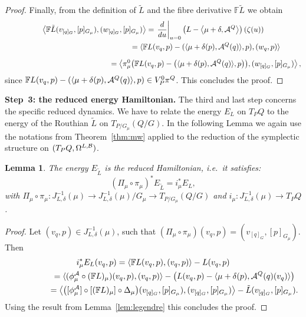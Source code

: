 \documentclass[11pt]{article}
\newtheorem{lemma}{Lemma}
\newcommand{\A}{{\cal A}}
\newcommand{\B}{{\cal B}}
\newcommand{\F}{\mathbb{F}}
\begin{document}
\begin{proof}
Finally, from the def\/inition of $\tilde L$ and the f\/ibre derivative $\F\tilde L$ we obtain
\begin{gather*}
\left\langle \F\tilde L(v_{[q]_G},[p]_{G_\mu}) , (w_{[q]_G},[p]_{G_\mu})\right\rangle
=\left.\frac{d}{du}\right|_{u=0}\left(L - \big\langle\mu+\delta, \A^Q\big\rangle\right)(\zeta(u))\\
\phantom{\left\langle \F\tilde L(v_{[q]_G},[p]_{G_\mu}) , (w_{[q]_G},[p]_{G_\mu})\right\rangle}{}
= \langle \F L(v_q,p)-(\langle\mu+\delta(p),\A^Q(q) \rangle, p),(w_q,p)\rangle\\[2mm]
\phantom{\left\langle \F\tilde L(v_{[q]_G},[p]_{G_\mu}) , (w_{[q]_G},[p]_{G_\mu})\right\rangle}{}
= \left\langle \pi^0_\mu\big(\F L(v_q,p)-\big(\langle \mu+\delta(p),\A^Q(q)\rangle,p\big)\big), (w_{[q]_G},[p]_{G_\mu})\right\rangle,
\end{gather*}
since $\F L(v_q,p)-(\langle \mu+\delta(p),\A^Q(q)\rangle,p) \in V^0_P\pi^Q$. This  concludes the proof.
\end{proof}

{\bf Step~3: the reduced energy Hamiltonian.}
The third and last step concerns the specif\/ic reduced dynamics. We have to relate the energy $E_L$  on $T_PQ$ to the energy of the Routhian $\tilde L$ on $T_{P/G_\mu}(Q/G)$.   In the following Lemma we again use the notations from Theorem~\ref{thm:mw} applied to the reduction of the symplectic structure on $(T_PQ,\Omega^{L,\B})$.
\begin{lemma}\label{lem:energy}
  The energy $E_{\tilde L}$ is the reduced Hamiltonian, i.e.\ it satisfies:
  \[
  (\Pi_\mu\circ\pi_\mu)^*E_{\tilde L} = i^*_\mu E_L,
  \]
  with $\Pi_\mu\circ\pi_\mu: J^{-1}_{L,\delta}(\mu)\to J^{-1}_{L,\delta}(\mu)/G_\mu\to T_{P/G_\mu}(Q/G)$ and $i_\mu:J^{-1}_{L,\delta}(\mu)\to T_PQ$.
\end{lemma}
\begin{proof}
Let $(v_q,p)\in J^{-1}_{L,\delta}(\mu)$, such that $(\Pi_\mu\circ\pi_\mu)(v_q,p)=(v_{[q]_G},[p]_{G_\mu})$. Then
\begin{gather*}
  i^*_\mu E_L(v_q,p) = \langle\F L(v_q,p),(v_q,p)\rangle-L(v_q,p)\\
  \phantom{i^*_\mu E_L(v_q,p)}{}
  = \langle  (\phi^\A_\mu\circ(\F L)_\mu)(v_q,p),(v_q,p)\rangle - \left(L(v_q,p)-\langle \mu+\delta(p),\A^Q(q)(v_q)\rangle\right)\\
 \phantom{i^*_\mu E_L(v_q,p)}{}
 = \left\langle \big([\phi^\A_\mu]\circ[(\F L)_\mu]\circ\Delta_\mu\big)(v_{[q]_G},[p]_{G_\mu}),(v_{[q]_G},[p]_{G_\mu})\right\rangle - \tilde L (v_{[q]_G},[p]_{G_\mu}).
\end{gather*}
Using the result from Lemma~\ref{lem:legendre} this concludes the proof.
\end{proof}
\end{document}

